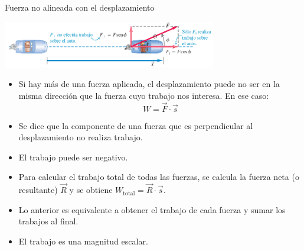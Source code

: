 \documentclass[9pt, aspectratio=169]{beamer}
\begin{document}
\begin{frame}{Fuerza no alineada con el desplazamiento}
    \begin{center}
        \includegraphics[width=0.7\textwidth]{figs/fig-02.png}
    \end{center}

\begin{multicols}{2}
    \begin{itemize}
        \item Si hay más de una fuerza aplicada, el desplazamiento puede no ser en la misma dirección que la fuerza cuyo trabajo nos interesa. En ese caso:
            \[ W = \vec{F} \cdot \vec{s} \]

        \item Se dice que la componente de una fuerza que es perpendicular al desplazamiento no realiza trabajo.
        \item El trabajo puede ser negativo.
        \item Para calcular el trabajo total de todas las fuerzas, 
            se calcula la fuerza neta (o resultante) $\vec{R}$ y se obtiene $W_{\text{total}} = \vec{R} \cdot \vec{s}$.
        \item Lo anterior es equivalente a obtener el trabajo de cada fuerza y sumar los trabajos al final.
        \item El trabajo es una magnitud \alert{escalar}.
    \end{itemize}
\end{multicols}
\end{frame}
\end{document}

